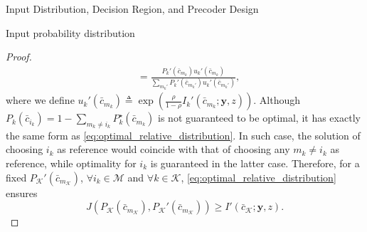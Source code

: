 \documentclass[journal]{IEEEtran}
\begin{document}
\begin{section}{Input Distribution, Decision Region, and Precoder Design}
\begin{subsection}{Input probability distribution}
\begin{proof}
\begin{subequations}
\begin{align}
						& = \frac{P_k'(\bar{c}_{m_k}) u_k'(\bar{c}_{m_k})}{\sum_{m_k'} P_k'(\bar{c}_{m_k'}) u_k'(\bar{c}_{m_k'})},
						\label{eq:optimal_relative_distribution}
					\end{align}
				\end{subequations}
				where we define $u_k'(\bar{c}_{m_k}) \triangleq \exp \left( \frac{\rho}{1 - \rho} I_k'(\bar{c}_{m_k};\boldsymbol{y},z) \right)$. Although $P_k(\bar{c}_{i_k}) = 1 - \sum_{m_k \ne i_k} P_k^{\star}(\bar{c}_{m_k})$ is not guaranteed to be optimal, it has exactly the same form as \eqref{eq:optimal_relative_distribution}. In such case, the solution of choosing $i_k$ as reference would coincide with that of choosing any $m_k \ne i_k$ as reference, while optimality for $i_k$ is guaranteed in the latter case. Therefore, for a fixed $P_{\mathcal{K}}'(\bar{c}_{m_{\mathcal{K}}})$, $\forall i_k \in \mathcal{M}$ and $\forall k \in \mathcal{K}$, \eqref{eq:optimal_relative_distribution} ensures
				\begin{equation}
					J \left( P_{\mathcal{K}}(\bar{c}_{m_{\mathcal{K}}}),P_{\mathcal{K}}'(\bar{c}_{m_{\mathcal{K}}}) \right) \ge I'(\bar{c}_{\mathcal{K}};\boldsymbol{y},z).
					\label{eq:information_difference_lower}
				\end{equation}


\end{proof}
\end{subsection}
\end{section}
\end{document}
